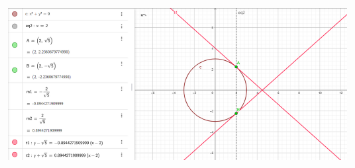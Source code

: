 \documentclass[12pt,a4paper,fleqn]{article}
\begin{document}
\begin{figure}[h!]
    \centering
    \includegraphics[width=0.8\textwidth]{./public/g1.png}
\end{figure}









\end{document}
